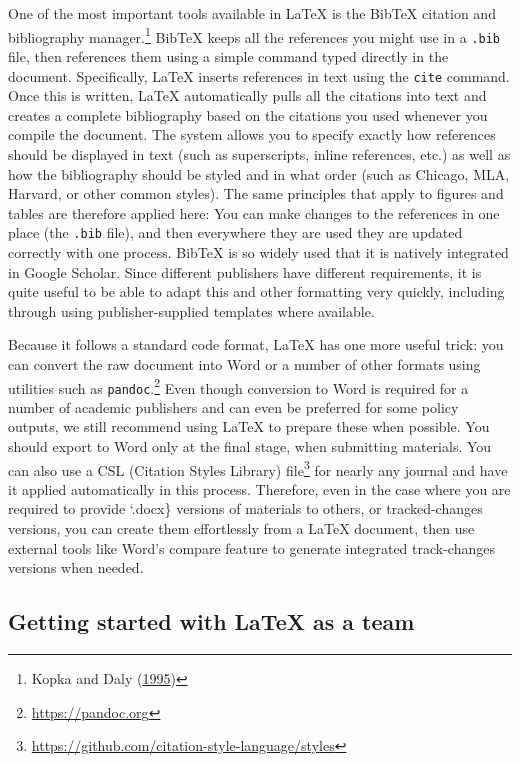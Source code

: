 \documentclass[
]{book}
\begin{document}
One of the most important tools available in LaTeX
is the BibTeX citation and bibliography manager.\footnote{Kopka and Daly (\protect\hyperlink{ref-kopka1995guide}{1995})}
BibTeX keeps all the references you might use in a \texttt{.bib} file,
then references them using a simple command typed directly in the document.
Specifically, LaTeX inserts references in text using the \texttt{cite} command.
Once this is written, LaTeX automatically pulls all the citations into text
and creates a complete bibliography based on the citations you used whenever you compile the document.
The system allows you to specify exactly how references should be displayed in text
(such as superscripts, inline references, etc.)
as well as how the bibliography should be styled and in what order
(such as Chicago, MLA, Harvard, or other common styles).
The same principles that apply to figures and tables are therefore applied here:
You can make changes to the references in one place (the \texttt{.bib} file),
and then everywhere they are used they are updated correctly with one process.
BibTeX is so widely used that it is natively integrated in Google Scholar.
Since different publishers have different requirements,
it is quite useful to be able to adapt this and other formatting very quickly,
including through using publisher-supplied templates where available.

Because it follows a standard code format,
LaTeX has one more useful trick:
you can convert the raw document into Word
or a number of other formats
using utilities such as \texttt{pandoc}.\footnote{\url{https://pandoc.org}}
Even though conversion to Word is required
for a number of academic publishers and can even be preferred for some policy outputs,
we still recommend using LaTeX to prepare these when possible.
You should export to Word only at the final stage, when submitting materials.
You can also use a CSL (Citation Styles Library) file\footnote{\url{https://github.com/citation-style-language/styles}}
for nearly any journal and have it applied automatically in this process.
Therefore, even in the case where you are required to provide
`.docx\} versions of materials to others, or tracked-changes versions,
you can create them effortlessly from a LaTeX document,
then use external tools like Word's compare feature
to generate integrated track-changes versions when needed.

\hypertarget{getting-started-with-latex-as-a-team}{%
\subsection*{Getting started with LaTeX as a team}\label{getting-started-with-latex-as-a-team}}
\end{document}
